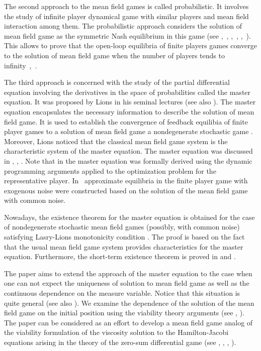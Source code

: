 \documentclass[a4paper,12pt]{article}
\begin{document}
The second approach to the mean field games is called probabilistic.  It involves the study of infinite player dynamical game with similar players and mean field interaction among them. The probabilistic approach considers the solution of mean field game as the symmetric Nash equilibrium in this game (see  \cite{Carmona_Delarue_2013},~\cite{Carmona_Delarue_I}, \cite{Carmona_Delarue_II},~\cite{Carmona_Delarue_Lachapelle_2013}, \cite{Carmona_Lacker_2015},~\cite{Lacker_2015}). This allows to  prove that the  open-loop equilibria of finite players games  converge to the solution of mean field game when the number of players tends to infinity~\cite{Fischer_convergence_2017},~\cite{Lacker_convergence_2016}.

The third approach is concerned with the study of the partial differential equation involving the derivatives in the space of probabilities called the master equation. It was proposed by Lions in his seminal lectures \cite{lions_lecture} (see also \cite{Cardaliaguet_notes}). The master equation encapsulates the necessary  information to describe the solution of mean field game. It is used to establish the convergence of feedback equilibia of finite player games to a solution of mean field game a nondegenerate stochastic game \cite{Cardaliaguet_Delarue_Lasry_Lions_2015}. Moreover, Lions noticed that the classical mean field game system is the characteristic system of the master equation. The master equation was discussed in \cite{Bensoussan_Frehse_Yam_book},  \cite{Bensoussan_Frehse_Yam_2014}, \cite{Carmona_master}. Note that in \cite{Carmona_master} the master equation was formally derived using the dynamic programming arguments applied to the optimization problem for the representative player. In~\cite{Kolokoltstov_Troeva_common_2015} approximate equilibria in the finite player game with exogenous noise were constructed based on the solution of the mean field game with common noise.

Nowadays, the existence theorem for the master equation is  obtained for the case of nondegenerate stochastic mean field games (possibly, with common noise)  satisfying Lasry-Lions monotonicity condition \cite{Cardaliaguet_Delarue_Lasry_Lions_2015}. The proof is based on the fact that the usual mean field game system provides characteristics for the master equation.  Furthermore, the short-term existence theorem is proved  in \cite{Carmona_Delarue_II} and \cite{Gangbo_Swiech_2015}.

The paper aims to extend the approach of the master equation to the case when one can not expect the uniqueness of solution to mean field game as well as the continuous dependence on the measure variable. Notice that this situation is quite general \cite{Bardi_Fischer_2017} (see also \cite{Lacker_convergence_2016}). We examine the dependence of   the solution of the mean field game on the initial position  using the viability theory arguments (see \cite{Aubin}, \cite{Aubin_Cellina}). The paper can be considered as an effort to develop a mean field game analog of the viability formulation of the viscosity solution to the Hamilton-Jacobi equations arising in the theory of the zero-sum differential game (see \cite{frankowska}, \cite{Subb_book}, \cite{vinter_wolenski}, \cite{wolenski}).
\end{document}
